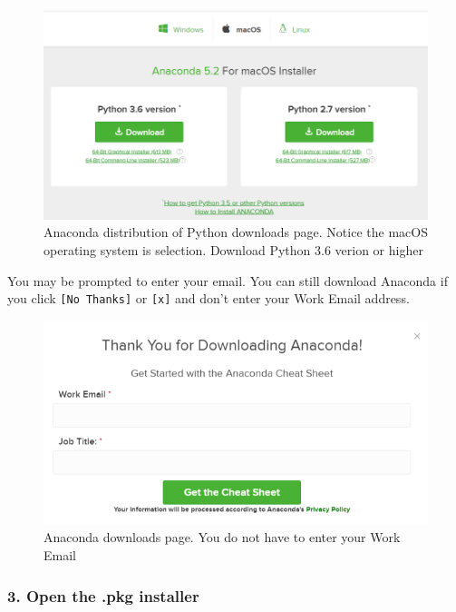 \documentclass{book}
\makeatletter
\def\maxwidth{\ifdim\Gin@nat@width>\linewidth\linewidth
    \else\Gin@nat@width\fi}
\let\Oldincludegraphics\includegraphics
\renewcommand{\includegraphics}[1]{\Oldincludegraphics[width=.8\maxwidth]{#1}}
\makeatother
\begin{document}
\begin{figure}
\centering
\includegraphics{images/anaconda_download_mac.png}
\caption{Anaconda distribution of Python downloads page. Notice the
macOS operating system is selection. Download Python 3.6 verion or
higher}
\end{figure}

You may be prompted to enter your email. You can still download Anaconda
if you click \lstinline![No Thanks]! or \lstinline![x]! and don't enter
your Work Email address.

\begin{figure}
\centering
\includegraphics{images/anaconda_download_mac_ask_for_email.png}
\caption{Anaconda downloads page. You do not have to enter your Work
Email}
\end{figure}
    




    
        \subsubsection{3. Open the .pkg
installer}\label{open-the-.pkg-installer}
\end{document}
